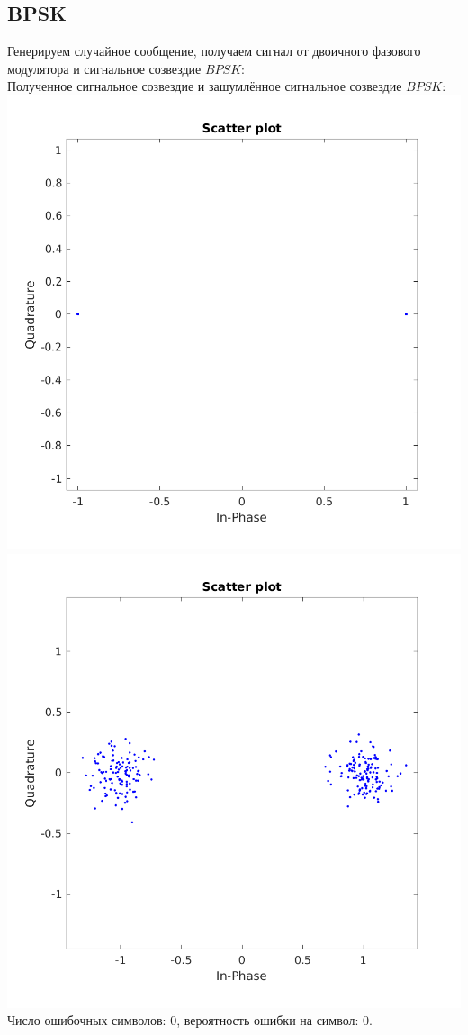 \documentclass[a4paper]{article}
\begin{document}
\subsection{BPSK}
Генерируем случайное сообщение, получаем сигнал от двоичного фазового модулятора и сигнальное созвездие $BPSK$:
\\
Полученное сигнальное созвездие  и зашумлённое сигнальное созвездие $BPSK$:\\
\includegraphics[scale=0.4]{lab6/figures/figure_0.png}
\includegraphics[scale=0.4]{lab6/figures/figure_1.png}\\
Число ошибочных символов: 0, вероятность ошибки на символ: 0.
\end{document}
